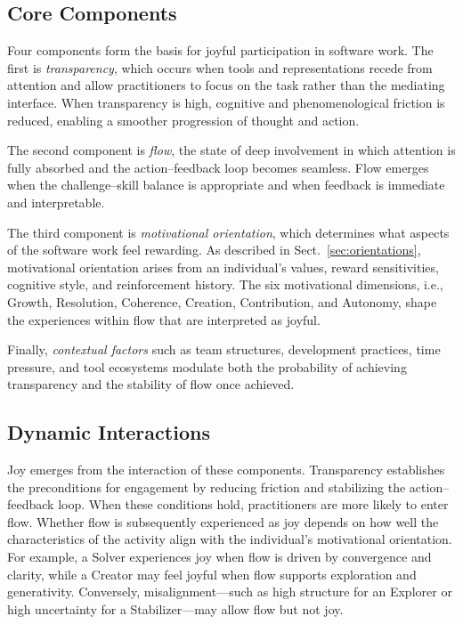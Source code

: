 \documentclass[12pt]{elsarticle}
\begin{document}
\subsection{Core Components}
Four components form the basis for joyful participation in software work. 
The first is \textit{transparency}, which occurs when tools and representations 
recede from attention and allow practitioners to focus on the task rather than 
the mediating interface. When transparency is high, cognitive and 
phenomenological friction is reduced, enabling a smoother progression of thought 
and action.

The second component is \textit{flow}, the state of deep involvement in which 
attention is fully absorbed and the action--feedback loop becomes seamless. 
Flow emerges when the challenge--skill balance is appropriate and when feedback 
is immediate and interpretable.

The third component is \textit{motivational orientation}, which determines what 
aspects of the software work feel rewarding. As described in Sect.~\ref{sec:orientations}, 
motivational orientation arises from an individual's values, reward 
sensitivities, cognitive style, and reinforcement history. The six motivational 
dimensions, i.e., Growth, Resolution, Coherence, Creation, Contribution, and Autonomy, 
shape the experiences within flow that are interpreted as joyful.

Finally, \textit{contextual factors} such as team structures, development 
practices, time pressure, and tool ecosystems modulate both the probability of 
achieving transparency and the stability of flow once achieved.

\subsection{Dynamic Interactions}
Joy emerges from the interaction of these components. Transparency establishes 
the preconditions for engagement by reducing friction and stabilizing the 
action--feedback loop. When these conditions hold, practitioners are more 
likely to enter flow. Whether flow is subsequently experienced as joy depends 
on how well the characteristics of the activity align with the individual's 
motivational orientation. For example, a Solver experiences joy when flow is 
driven by convergence and clarity, while a Creator may feel joyful when flow 
supports exploration and generativity. Conversely, misalignment—such as high 
structure for an Explorer or high uncertainty for a Stabilizer—may allow flow 
but not joy.
\end{document}

